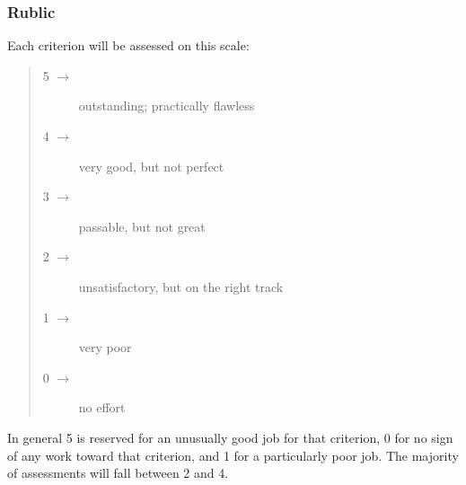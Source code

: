 \documentclass[a4paper]{article}
\begin{document}
\subsubsection*{Rublic}
Each criterion will be assessed on this scale:
\begin{quote}
  \begin{description}
  \item[5 $\to$] outstanding; practically flawless
  \item[4 $\to$] very good, but not perfect
  \item[3 $\to$] passable, but not great
  \item[2 $\to$] unsatisfactory, but on the right track
  \item[1 $\to$] very poor
  \item[0 $\to$] no effort
  \end{description}
\end{quote}
In general 5 is reserved for an unusually good job for that criterion,
0 for no sign of any work toward that criterion,
and 1 for a particularly poor job.
The majority of assessments will fall between 2 and 4.
\end{document}
